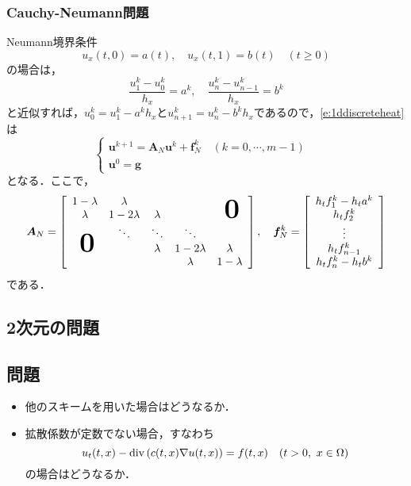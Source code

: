 \subsubsection{Cauchy-Neumann問題}
Neumann境界条件
\begin{equation}
\label{e:1dneumann}
u_x(t,0)=a(t),\quad u_x(t,1)=b(t)\quad(t\ge0)
\end{equation}
の場合は，
$$
\frac{u_1^k-u_0^k}{h_x}=a^k,\quad \frac{u_{n}^k-u_{n-1}^k}{h_x}=b^k
$$
と近似すれば，$u_0^k=u_1^k-a^kh_x$と$u_{n+1}^k=u_n^k-b^kh_x$であるので，\eqref{e:1ddiscreteheat}は
\begin{equation}
	\begin{cases}
		\bm{u}^{k+1}=\bm{A}_N\bm{u}^k + \bm{f}_N^k\quad(k=0,\cdots,m-1)&\\
		\bm{u}^0=\bm{g}&
	\end{cases}
\end{equation}
となる．ここで，
\begin{equation}
\bm{A}_N=\left[\begin{array}{ccccc}
	1-\lambda&\lambda&&&\\
	\lambda&1-2\lambda&\lambda&&\hsymb{\bm{0}}\\
	&\ddots&\ddots&\ddots&\\
	\hsymb{\bm{0}}&&\lambda&1-2\lambda&\lambda\\
	&&&\lambda&1-\lambda
	\end{array}\right],\quad
\bm{f}^k_N=\left[\begin{array}{c}
	h_t f_1^k-h_t a^k\\
	h_t f_2^k\\
	\vdots\\
	h_t f_{n-1}^k\\
	h_t f_{n}^k -h_t b^k
	\end{array}\right]	
\end{equation}
である．

\subsection{2次元の問題}



\subsection{問題}
\begin{itemize}
\item 他のスキームを用いた場合はどうなるか．
\item 拡散係数が定数でない場合，すなわち
$$
u_t(t,x)-\operatorname{\mathrm{div}\,}(c(t,x)\nabla u(t,x))=f(t,x)\quad(t>0,\ x\in\Omega)
$$
の場合はどうなるか．
\end{itemize}







